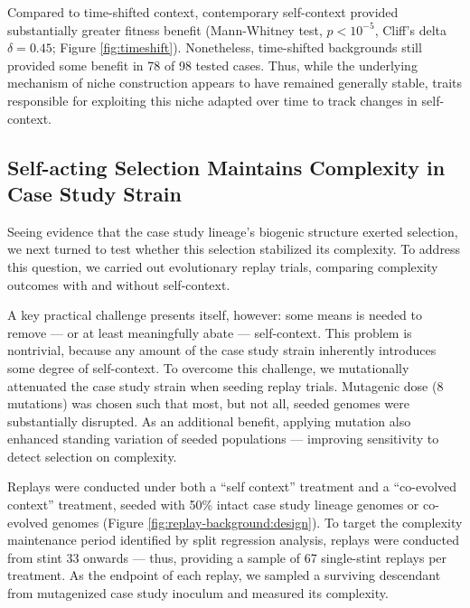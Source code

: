 Compared to time-shifted context, contemporary self-context provided substantially greater fitness benefit (Mann-Whitney test, $p<10^{-5}$, Cliff's delta $\delta=0.45$; Figure \ref{fig:timeshift}).
Nonetheless, time-shifted backgrounds still provided some benefit in 78 of 98 tested cases.
Thus, while the underlying mechanism of niche construction appears to have remained generally stable, traits responsible for exploiting this niche adapted over time to track changes in self-context.

\subsection{Self-acting Selection Maintains Complexity in Case Study Strain}



Seeing evidence that the case study lineage's biogenic structure exerted selection, we next turned to test whether this selection stabilized its complexity.
To address this question, we carried out evolutionary replay trials, comparing complexity outcomes with and without self-context.

A key practical challenge presents itself, however: some means is needed to remove --- or at least meaningfully abate --- self-context.
This problem is nontrivial, because any amount of the case study strain inherently introduces some degree of self-context.
To overcome this challenge, we mutationally attenuated the case study strain when seeding replay trials.
Mutagenic dose (8 mutations) was chosen such that most, but not all, seeded genomes were substantially disrupted.
As an additional benefit, applying mutation also enhanced standing variation of seeded populations --- improving sensitivity to detect selection on complexity.

Replays were conducted under both a ``self context'' treatment and a ``co-evolved context'' treatment, seeded with 50\% intact case study lineage genomes or co-evolved genomes (Figure \ref{fig:replay-background:design}).
To target the complexity maintenance period identified by split regression analysis, replays were conducted from stint 33 onwards --- thus, providing a sample of 67 single-stint replays per treatment.
As the endpoint of each replay, we sampled a surviving descendant from mutagenized case study inoculum and measured its complexity.

